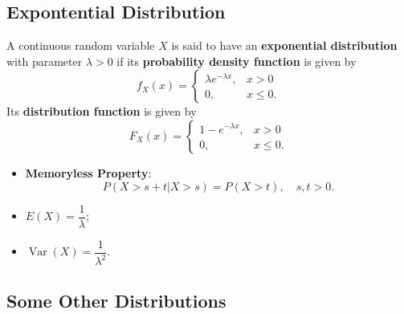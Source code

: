 \subsection{Expontential Distribution}

 A continuous random variable \(X\) is said
to have an \textbf{exponential distribution} with parameter 
\(\lambda > 0\) if its \textbf{probability density function} is given by
\[f_X(x) = \begin{cases}
  \lambda e^{-\lambda x}, & x > 0 \\
  0, & x \leq 0.
\end{cases}\]
Its \textbf{distribution function} is given by
\[F_X(x) = \begin{cases}
  1 - e^{-\lambda x}, & x > 0 \\
  0, & x \leq 0.
\end{cases}\]
\begin{itemize}
  \item \textbf{Memoryless Property}: 
    \[P(X > s + t | X > s) = P(X > t), \quad s, t > 0.\]
\end{itemize}
\begin{multicols}{2}
  \begin{itemize}
    \item \(E(X) = \dfrac{1}{\lambda}\);
    \item \(\operatorname{Var}(X) = \dfrac{1}{\lambda^2}\).
  \end{itemize} 
\end{multicols}

\subsection{Some Other Distributions}

